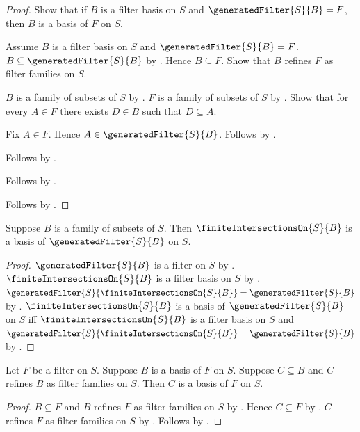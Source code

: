 \begin{proof}
    Show that if $B$ is a filter basis on $S$ and
        $\generatedFilter{S}{B}=F$, then
        $B$ is a basis of $F$ on $S$.
    \begin{subproof}
        Assume $B$ is a filter basis on $S$ and
            $\generatedFilter{S}{B}=F$.
        $B\subseteq\generatedFilter{S}{B}$
            by .
        Hence $B\subseteq F$.
        Show that $B$ refines $F$ as filter families on $S$.
        \begin{subproof}
            $B$ is a family of subsets of $S$
                by .
            $F$ is a family of subsets of $S$ by .
            Show that for every $A\in F$ there exists $D\in B$ such that
                $D\subseteq A$.
            \begin{subproof}
                Fix $A\in F$.
                Hence $A\in\generatedFilter{S}{B}$.
                Follows by .
            \end{subproof}
            Follows by .
        \end{subproof}
        Follows by .
    \end{subproof}
    Follows by \auto.
\end{proof}

\begin{corollary}\label{finite_intersections_on_is_basis_of_generated_filter}
    Suppose $B$ is a family of subsets of $S$.
    Then $\finiteIntersectionsOn{S}{B}$ is a basis of
        $\generatedFilter{S}{B}$ on $S$.
\end{corollary}
\begin{proof}
    $\generatedFilter{S}{B}$ is a filter on $S$ by
        .
    $\finiteIntersectionsOn{S}{B}$ is a filter basis on $S$ by
        .
    $\generatedFilter{S}{\finiteIntersectionsOn{S}{B}}
        =\generatedFilter{S}{B}$ by
        .
    $\finiteIntersectionsOn{S}{B}$ is a basis of
        $\generatedFilter{S}{B}$ on $S$ iff
        $\finiteIntersectionsOn{S}{B}$ is a filter basis on $S$ and
        $\generatedFilter{S}{\finiteIntersectionsOn{S}{B}}
            =\generatedFilter{S}{B}$ by
        .
\end{proof}

\begin{theorem}\label{refining_subfamily_is_filter_basis}
    Let $F$ be a filter on $S$.
    Suppose $B$ is a basis of $F$ on $S$.
    Suppose $C\subseteq B$ and
        $C$ refines $B$ as filter families on $S$.
    Then $C$ is a basis of $F$ on $S$.
\end{theorem}
\begin{proof}
    $B\subseteq F$ and $B$ refines $F$ as filter families on $S$
        by .
    Hence $C\subseteq F$ by .
    $C$ refines $F$ as filter families on $S$
        by .
    Follows by .
\end{proof}
